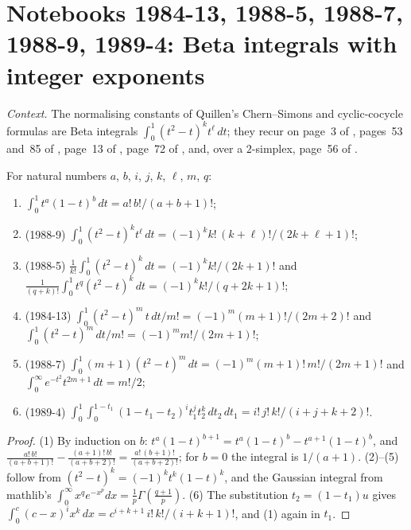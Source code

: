 \section[Notebooks 1984-13 to 1989-4: Beta integrals]{Notebooks 1984-13, 1988-5, 1988-7, 1988-9, 1989-4: Beta integrals with integer exponents\protect{}}\label{sec:quillen-1988-9}

\emph{Context.} The normalising constants of Quillen's Chern--Simons and cyclic-cocycle formulas are Beta integrals $\int_0^1(t^2 - t)^kt^\ell\,dt$; they recur on page~3 of , pages~53 and~85 of , page~13 of , page~72 of , and, over a $2$-simplex, page~56 of .

\begin{encadre}
\begin{theoreme}\label{thm:quillen-1988-9}
For natural numbers $a$, $b$, $i$, $j$, $k$, $\ell$, $m$, $q$:
\begin{enumerate}
\item $\int_0^1 t^a(1 - t)^b\,dt = a!\,b!/(a + b + 1)!$;
\item (1988-9) $\int_0^1(t^2 - t)^kt^\ell\,dt = (-1)^kk!\,(k + \ell)!/(2k + \ell + 1)!$;
\item (1988-5) $\frac1{k!}\int_0^1(t^2 - t)^k\,dt = (-1)^kk!/(2k + 1)!$ and $\frac1{(q+k)!}\int_0^1t^q(t^2 - t)^k\,dt = (-1)^kk!/(q + 2k + 1)!$;
\item (1984-13) $\int_0^1(t^2 - t)^m\,t\,dt/m! = (-1)^m(m + 1)!/(2m + 2)!$ and $\int_0^1(t^2 - t)^m\,dt/m! = (-1)^mm!/(2m + 1)!$;
\item (1988-7) $\int_0^1(m + 1)(t^2 - t)^m\,dt = (-1)^m(m + 1)!\,m!/(2m + 1)!$ and $\int_0^\infty e^{-t^2}t^{2m+1}\,dt = m!/2$;
\item (1989-4) $\int_0^1\int_0^{1-t_1}(1 - t_1 - t_2)^it_1^jt_2^k\,dt_2\,dt_1 = i!\,j!\,k!/(i + j + k + 2)!$.
\end{enumerate}
\end{theoreme}
\end{encadre}

\begin{proof}
(1) By induction on $b$: $t^a(1 - t)^{b+1} = t^a(1 - t)^b - t^{a+1}(1 - t)^b$, and $\frac{a!\,b!}{(a+b+1)!} - \frac{(a+1)!\,b!}{(a+b+2)!} = \frac{a!\,(b+1)!}{(a+b+2)!}$; for $b = 0$ the integral is $1/(a + 1)$. (2)--(5) follow from $(t^2 - t)^k = (-1)^kt^k(1 - t)^k$, and the Gaussian integral from mathlib's $\int_0^\infty x^qe^{-x^p}dx = \frac1p\Gamma(\frac{q+1}p)$. (6) The substitution $t_2 = (1 - t_1)u$ gives $\int_0^c(c - x)^ix^k\,dx = c^{i+k+1}\,i!\,k!/(i + k + 1)!$, and (1) again in $t_1$.
\end{proof}

